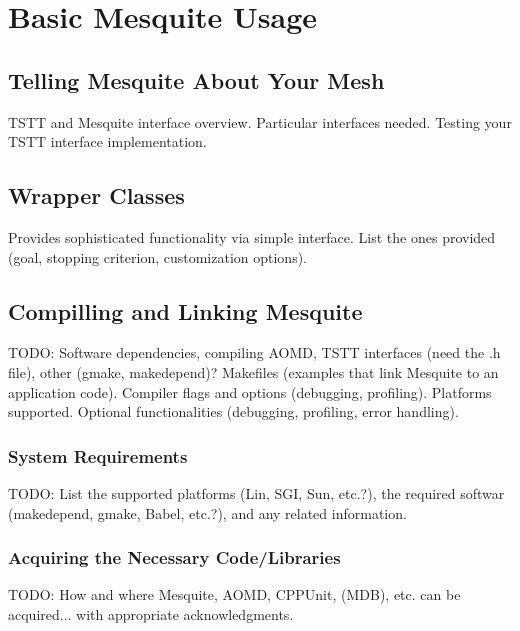 \section{Basic Mesquite Usage}

\subsection{Telling Mesquite About Your Mesh}
TSTT and Mesquite interface overview. Particular interfaces needed. 
Testing your TSTT interface implementation.

\subsection{Wrapper Classes}
Provides sophisticated functionality via simple interface. List the ones
provided (goal, stopping criterion, customization options).

\subsection{Compilling and Linking Mesquite}
TODO:  Software dependencies, compiling AOMD, TSTT interfaces
(need the .h file),
other (gmake, makedepend)?  Makefiles (examples that link Mesquite to an 
application code). Compiler flags and options (debugging, profiling). 
Platforms supported. Optional functionalities (debugging, profiling, 
error handling).
\subsubsection{System Requirements}
TODO:  List the supported platforms (Lin, SGI, Sun, etc.?), the required
softwar (makedepend, gmake, Babel, etc.?), and any related information.
\subsubsection{Acquiring the Necessary Code/Libraries}
TODO:  How and where Mesquite, AOMD, CPPUnit, (MDB), etc. can be
acquired... with appropriate acknowledgments.
